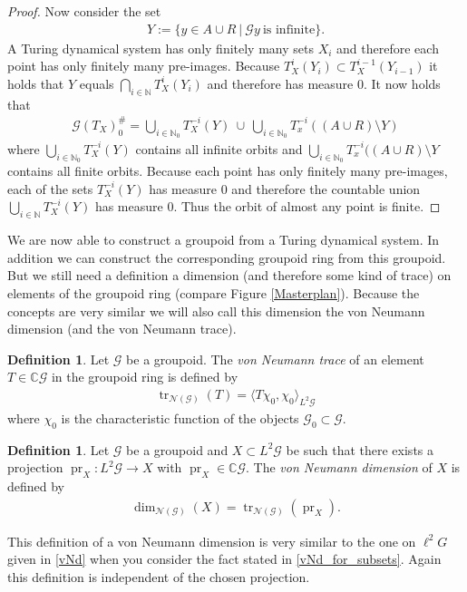\documentclass[12pt,a4paper]{scrartcl}
\theoremstyle{plain}
\theoremstyle{definition}
\newtheorem{Definition}[Theorem]{Definition}
\newcommand{\C}{\mathbb{C}} %
\newcommand{\N}{\mathbb{N}} %
\newcommand{\2}{\mathbb{Z} / 2 \mathbb{Z}}
\newcommand{\G}{\mathcal{G}}
\newcommand{\1}{\bar{1}}
\newcommand{\0}{\bar{0}}
\newcommand{\tr}{\operatorname{tr}}
\newcommand{\pr}{\operatorname{pr}}
\begin{document}
\begin{proof}
	Now consider the set 
	\begin{align*}
		Y := \{y \in A \cup R ~|~ \G y ~ \text{is infinite}\}. 
	\end{align*}
	A Turing dynamical system has only finitely many sets $X_i$ and therefore each point has only finitely many pre-images. Because $T_X^i(Y_i) \subset T_X^{i-1}(Y_{i-1})$ it holds that $Y$ equals $\bigcap_{i \in \N} T_X^i(Y_i)$ and therefore has measure $0$. It now holds that 
	\begin{align*}
		\G (T_X)_0^\# =\bigcup_{i \in \N_0 }T_X^{-i}(Y) ~\cup~ \bigcup_{i \in \N_0 }T_x^{-i}((A\cup R) \setminus Y)
	\end{align*}
	where $\bigcup_{i \in \N_0 }T_X^{-i}(Y)$ contains all infinite orbits and $\bigcup_{i \in \N_0 }T_x^{-i}((A\cup R) \setminus Y$ contains all finite orbits. Because each point has only finitely many pre-images, each of the sets $T_X^{-i}(Y)$ has measure $0$ and therefore the countable union $\bigcup_{i \in \N }T_X^{-i}(Y)$ has measure $0$. Thus the orbit of almost any point is finite. 
\end{proof} 
We are now able to construct a groupoid from a Turing dynamical system. In addition we can construct the corresponding groupoid ring from this groupoid. But we still need a definition a dimension (and therefore some kind of trace) on elements of the groupoid ring (compare Figure \ref{Masterplan}). Because the concepts are very similar we will also call this dimension the von Neumann dimension (and the von Neumann trace).
\begin{Definition}
	Let $\G$ be a groupoid. The \emph{von Neumann trace} of an element $T \in \C \G$ in the groupoid ring is defined by
	\begin{align*}
		\tr_{\mathcal{N}(\G)}(T) = \langle T \chi_0, \chi_0 \rangle_{L^2 \G}
	\end{align*}
	where $\chi_0$ is the characteristic function of the objects $\G_0 \subset \G$.
\end{Definition}
\begin{Definition} \label{vNd_of_groupoids}
	Let $\G$ be a groupoid and $X \subset L^2 \G$ be such that there exists a projection $\pr_X\colon L^2 \G \to X$ with $\pr_X \in \C \G$. The \emph{von Neumann dimension} of $X$ is defined by
	\begin{align*}
		\dim_{\mathcal{N}(\G)}(X) = \tr_{\mathcal{N}(\G)}(\pr_X).
	\end{align*}
\end{Definition}
This definition of a von Neumann dimension is very similar to the one on $\ell^2 G$ given in \ref{vNd} when you consider the fact stated in \ref{vNd_for_subsets}. Again this definition is independent of the chosen projection.
\end{document}
